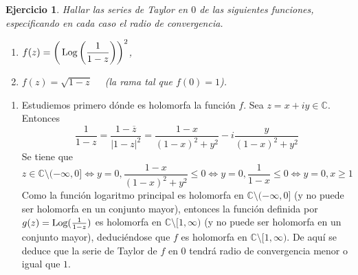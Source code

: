 \documentclass[11pt]{report}
\makeatletter
\renewenvironment{proof}[1][\proofname]{\par
  \pushQED{\qed}%
  \normalfont \topsep\z@skip %
  \trivlist
  \item[\hskip\labelsep
        \itshape
    #1\@addpunct{.}]\ignorespaces
}{%
  \popQED\endtrivlist\@endpefalse
}
\newcommand{\C}{\mathbb C}
\newcommand{\pars}[1]{\left( #1 \right)} %
\newcommand{\Log}[1]{\,\textup{Log}\pars{#1}}
\newtheorem{exercise}{Ejercicio}
\makeatother
\begin{document}
\begin{exercise}
Hallar las series de Taylor en $0$ de las siguientes funciones, especificando en cada caso el radio de convergencia.
\begin{multicols}{2}
\centering
\begin{enumerate}
    \item $\displaystyle f(z) = \left(\Log{\frac{1}{1-z}}\right)^2$,
    \item $\displaystyle f(z) = \sqrt{1-z} \quad $ \emph{(}la rama tal que $f(0) =1$\emph{)}.
\end{enumerate}
\end{multicols}
\end{exercise}

\begin{proof}
\hfill
\begin{enumerate}
    \item Estudiemos primero dónde es holomorfa la función $f$. Sea $z=x+iy \in \C$. Entonces
    \[\frac{1}{1-z} = \frac{1-\overline{z}}{|1-z|^2} = \frac{1-x}{(1-x)^2+y^2}-i\frac{y}{(1-x)^2+y^2}\]
    Se tiene que
    \[z \in \C \setminus (-\infty,0]  \iff y= 0, \frac{1-x}{(1-x)^2+y^2} \leq 0 \iff y = 0, \frac{1}{1-x} \leq 0 \iff y = 0, x \geq 1\]
    Como la función logaritmo principal es holomorfa en $\C \setminus (-\infty,0]$ (y no puede ser holomorfa en un conjunto mayor), entonces la función definida por $g(z)= \textup{Log}(\frac{1}{1-z})$ es holomorfa en $\C \setminus[1,\infty)$ (y no puede ser holomorfa en un conjunto mayor), deduciéndose que $f$ es holomorfa en $\C \setminus [1,\infty)$. De aquí se deduce que la serie de Taylor de $f$ en $0$ tendrá radio de convergencia menor o igual que $1$.


\end{enumerate}
\end{proof}
\end{document}
